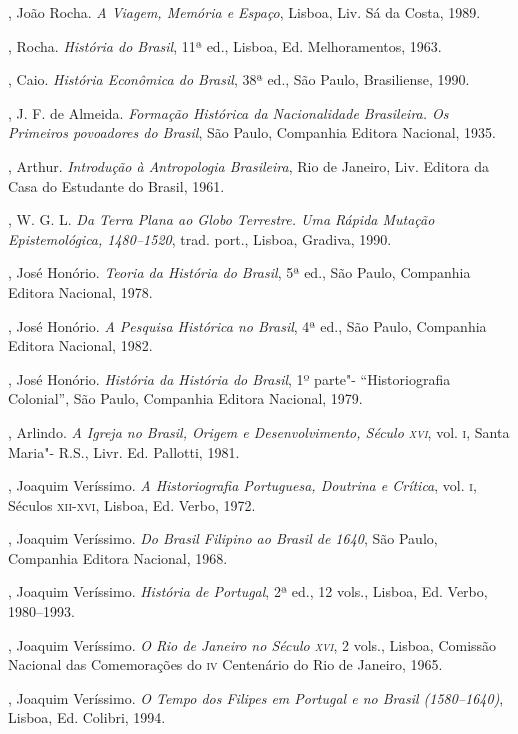 \begin{bibliohedra}
, João Rocha. \textit{A Viagem, Memória e Espaço}, Lisboa, Liv.
Sá da Costa, 1989.

, Rocha. \textit{História do Brasil}, 11ª ed., Lisboa, Ed.
Melhoramentos, 1963.

, Caio. \textit{História Econômica do Brasil}, 38ª ed.,
São Paulo, Brasiliense, 1990.

, J. F. de Almeida. \textit{Formação Histórica da Nacionalidade
Brasileira. Os Primeiros povoadores do Brasil}, São Paulo, Companhia
Editora Nacional, 1935.

, Arthur. \textit{Introdução à Antropologia Brasileira}, Rio de
Janeiro, Liv. Editora da Casa do Estudante do Brasil, 1961.

, W. G. L. \textit{Da Terra Plana ao Globo Terrestre. Uma
Rápida Mutação Epistemológica, 1480--1520}, trad. port., Lisboa, Gradiva, 1990.

, José Honório. \textit{Teoria da História do Brasil}, 5ª
ed., São Paulo, Companhia Editora Nacional, 1978.

, José Honório. \textit{A Pesquisa Histórica no Brasil}, 4ª
ed., São Paulo, Companhia Editora Nacional, 1982.

, José Honório. \textit{História da História do Brasil}, 1º
parte"- ``Historiografia Colonial'', São Paulo, Companhia Editora
Nacional, 1979.

, Arlindo. \textit{A Igreja no Brasil, Origem e Desenvolvimento,
Século \textsc{xvi}}, vol. \textsc{i}, Santa Maria"- R.S., Livr. Ed. Pallotti, 1981.

, Joaquim Veríssimo. \textit{A Historiografia Portuguesa,
Doutrina e Crítica}, vol. \textsc{i}, Séculos \textsc{xii}-\textsc{xvi}, Lisboa, Ed. Verbo, 1972.

, Joaquim Veríssimo. \textit{Do Brasil Filipino ao Brasil de
1640}, São Paulo, Companhia Editora Nacional, 1968.

, Joaquim Veríssimo. \textit{História de Portugal}, 2ª ed., 12
vols., Lisboa, Ed. Verbo, 1980--1993.

, Joaquim Veríssimo. \textit{O Rio de Janeiro no Século \textsc{xvi}}, 2
vols., Lisboa, Comissão Nacional das Comemorações do \textsc{iv} Centenário do
Rio de Janeiro, 1965. 

, Joaquim Veríssimo. \textit{O Tempo dos Filipes em Portugal e no
Brasil (1580--1640)}, Lisboa, Ed. Colibri, 1994.


\end{bibliohedra}
